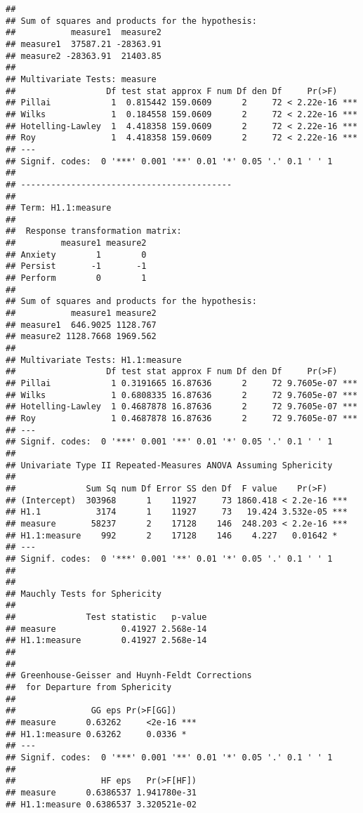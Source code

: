 \documentclass{article}\usepackage[]{graphicx}\usepackage[]{color}
\makeatletter
\newenvironment{kframe}{%
 \def\at@end@of@kframe{}%
 \ifinner\ifhmode%
  \def\at@end@of@kframe{\end{minipage}}%
  \begin{minipage}{\columnwidth}%
 \fi\fi%
 \def\FrameCommand##1{\hskip\@totalleftmargin \hskip-\fboxsep
 \colorbox{shadecolor}{##1}\hskip-\fboxsep
     \hskip-\linewidth \hskip-\@totalleftmargin \hskip\columnwidth}%
 \MakeFramed {\advance\hsize-\width
   \@totalleftmargin\z@ \linewidth\hsize
   \@setminipage}}%
 {\par\unskip\endMakeFramed%
 \at@end@of@kframe}
\newenvironment{knitrout}{}{} %
\makeatother
\begin{document}
\begin{knitrout}
\begin{kframe}
\begin{verbatim}
## 
## Sum of squares and products for the hypothesis:
##           measure1  measure2
## measure1  37587.21 -28363.91
## measure2 -28363.91  21403.85
## 
## Multivariate Tests: measure
##                  Df test stat approx F num Df den Df     Pr(>F)    
## Pillai            1  0.815442 159.0609      2     72 < 2.22e-16 ***
## Wilks             1  0.184558 159.0609      2     72 < 2.22e-16 ***
## Hotelling-Lawley  1  4.418358 159.0609      2     72 < 2.22e-16 ***
## Roy               1  4.418358 159.0609      2     72 < 2.22e-16 ***
## ---
## Signif. codes:  0 '***' 0.001 '**' 0.01 '*' 0.05 '.' 0.1 ' ' 1
## 
## ------------------------------------------
##  
## Term: H1.1:measure 
## 
##  Response transformation matrix:
##         measure1 measure2
## Anxiety        1        0
## Persist       -1       -1
## Perform        0        1
## 
## Sum of squares and products for the hypothesis:
##           measure1 measure2
## measure1  646.9025 1128.767
## measure2 1128.7668 1969.562
## 
## Multivariate Tests: H1.1:measure
##                  Df test stat approx F num Df den Df     Pr(>F)    
## Pillai            1 0.3191665 16.87636      2     72 9.7605e-07 ***
## Wilks             1 0.6808335 16.87636      2     72 9.7605e-07 ***
## Hotelling-Lawley  1 0.4687878 16.87636      2     72 9.7605e-07 ***
## Roy               1 0.4687878 16.87636      2     72 9.7605e-07 ***
## ---
## Signif. codes:  0 '***' 0.001 '**' 0.01 '*' 0.05 '.' 0.1 ' ' 1
## 
## Univariate Type II Repeated-Measures ANOVA Assuming Sphericity
## 
##              Sum Sq num Df Error SS den Df  F value    Pr(>F)    
## (Intercept)  303968      1    11927     73 1860.418 < 2.2e-16 ***
## H1.1           3174      1    11927     73   19.424 3.532e-05 ***
## measure       58237      2    17128    146  248.203 < 2.2e-16 ***
## H1.1:measure    992      2    17128    146    4.227   0.01642 *  
## ---
## Signif. codes:  0 '***' 0.001 '**' 0.01 '*' 0.05 '.' 0.1 ' ' 1
## 
## 
## Mauchly Tests for Sphericity
## 
##              Test statistic   p-value
## measure             0.41927 2.568e-14
## H1.1:measure        0.41927 2.568e-14
## 
## 
## Greenhouse-Geisser and Huynh-Feldt Corrections
##  for Departure from Sphericity
## 
##               GG eps Pr(>F[GG])    
## measure      0.63262     <2e-16 ***
## H1.1:measure 0.63262     0.0336 *  
## ---
## Signif. codes:  0 '***' 0.001 '**' 0.01 '*' 0.05 '.' 0.1 ' ' 1
## 
##                 HF eps   Pr(>F[HF])
## measure      0.6386537 1.941780e-31
## H1.1:measure 0.6386537 3.320521e-02
\end{verbatim}
\begin{alltt}

\end{alltt}
\end{kframe}
\end{knitrout}
\end{document}

